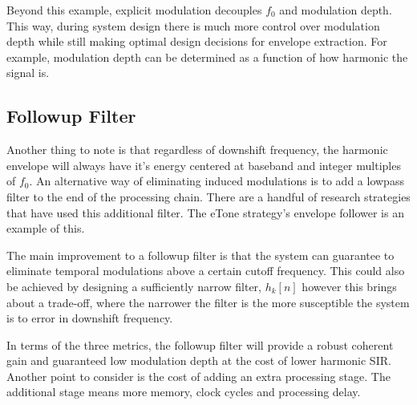 \documentclass [11pt, proquest,oneside] {ganter_thesis}[2015/03/03]
\begin{document}
Beyond this example, explicit modulation decouples $f_0$ and modulation depth.  This way, during system design there is much more control over modulation depth while still making optimal design decisions for envelope extraction.  For example, modulation depth can be determined as a function of how harmonic the signal is.

\subsection{Followup Filter}

Another thing to note is that regardless of downshift frequency, the harmonic envelope will always have it's energy centered at baseband and integer multiples of $f_0$.  An alternative way of eliminating induced modulations is to add a lowpass filter to the end of the processing chain.  There are a handful of research strategies that have used this additional filter.  The eTone strategy's \cite{vandali2011development} envelope follower is an example of this.

The main improvement to a followup filter is that the system can guarantee to eliminate temporal modulations above a certain cutoff frequency.  This could also be achieved by designing a sufficiently narrow filter, $h_k[n]$ however this brings about a trade-off, where the narrower the filter is the more susceptible the system is to error in downshift frequency.

In terms of the three metrics, the followup filter will provide a robust coherent gain and guaranteed low modulation depth at the cost of lower harmonic SIR.  Another point to consider is the cost of adding an extra processing stage.  The additional stage means more memory, clock cycles and processing delay.

\end{document}
